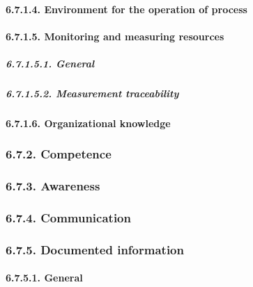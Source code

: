 \documentclass[
]{article}
\begin{document}
\hypertarget{environment-for-the-operation-of-process-1}{%
\paragraph{6.7.1.4. Environment for the operation of
process}\label{environment-for-the-operation-of-process-1}}

\hypertarget{monitoring-and-measuring-resources-1}{%
\paragraph{6.7.1.5. Monitoring and measuring
resources}\label{monitoring-and-measuring-resources-1}}

\hypertarget{general-11}{%
\subparagraph{6.7.1.5.1. General}\label{general-11}}

\hypertarget{measurement-traceability-1}{%
\subparagraph{6.7.1.5.2. Measurement
traceability}\label{measurement-traceability-1}}

\hypertarget{organizational-knowledge-1}{%
\paragraph{6.7.1.6. Organizational
knowledge}\label{organizational-knowledge-1}}

\hypertarget{competence-1}{%
\subsubsection{6.7.2. Competence}\label{competence-1}}

\hypertarget{awareness-1}{%
\subsubsection{6.7.3. Awareness}\label{awareness-1}}

\hypertarget{communication-1}{%
\subsubsection{6.7.4. Communication}\label{communication-1}}

\hypertarget{documented-information-1}{%
\subsubsection{6.7.5. Documented
information}\label{documented-information-1}}

\hypertarget{general-12}{%
\paragraph{6.7.5.1. General}\label{general-12}}
\end{document}
